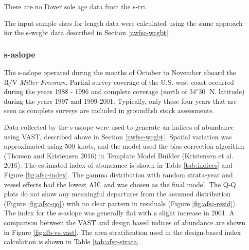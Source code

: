 \documentclass[11pt,
  english,
  a4paper,
]{article}
\begin{document}
\leavevmode\tagmcend\tagstructend\par


There are no Dover sole age data from the \gls{s-tri}.

\leavevmode\tagmcend\tagstructend\par


The input sample sizes for length data were calculated using the same approach for the \gls{s-wcgbt} data described in Section \ref{nwfsc-wcgbt}.

\leavevmode\tagmcend\tagstructend\par


\hypertarget{section-1}{%
\subsubsection{\texorpdfstring{\acrlong{s-aslope}}{}}\label{section-1}}

\leavevmode\tagmcend\tagstructend


The \gls{s-aslope} operated during the months of October to November aboard the R/V \emph{Miller Freeman}. Partial survey coverage of the U.S. west coast occurred during the years 1988 - 1996 and complete coverage (north of {\(34^\circ 30^\prime\)\leavevmode\tagmcend\tagstructend} N. latitude) during the years 1997 and 1999-2001. Typically, only these four years that are seen as complete surveys are included in groundfish stock assessments.

\leavevmode\tagmcend\tagstructend\par


Data collected by the \gls{s-aslope} were used to generate an indices of abundance using VAST, described above in Section \ref{nwfsc-wcgbt}. Spatial variation was approximated using 500 knots, and the model used the bias-correction algorithm {(Thorson and Kristensen 2016)\leavevmode\tagmcend\tagstructend} in Template Model Builder {(Kristensen et al. 2016)\leavevmode\tagmcend\tagstructend}. The estimated index of abundance is shown in Table \ref{tab:indices} and Figure \ref{fig:afsc-index}. The gamma distribution with random strata-year and vessel effects had the lowest AIC and was chosen as the final model. The Q-Q plots do not show any meaningful departures from the assumed distribution (Figure \ref{fig:afsc-qq}) with no clear pattern in residuals (Figure \ref{fig:afsc-resid}). The index for the \gls{s-aslope} was generally flat with a slight increase in 2001. A comparison between the VAST and design based indices of abundance are shown in Figure \ref{fig:db-vs-vast}. The area stratification used in the design-based index calculation is shown in Table \ref{tab:afsc-strata}.
\end{document}
